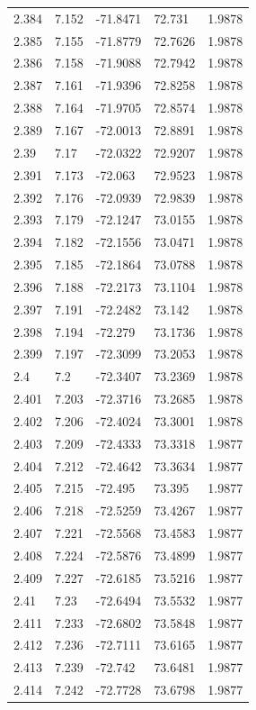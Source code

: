 \begin{tabular}{lllll}
2.384 & 7.152 & -71.8471 & 72.731 & 1.9878 \\
2.385 & 7.155 & -71.8779 & 72.7626 & 1.9878 \\
2.386 & 7.158 & -71.9088 & 72.7942 & 1.9878 \\
2.387 & 7.161 & -71.9396 & 72.8258 & 1.9878 \\
2.388 & 7.164 & -71.9705 & 72.8574 & 1.9878 \\
2.389 & 7.167 & -72.0013 & 72.8891 & 1.9878 \\
2.39 & 7.17 & -72.0322 & 72.9207 & 1.9878 \\
2.391 & 7.173 & -72.063 & 72.9523 & 1.9878 \\
2.392 & 7.176 & -72.0939 & 72.9839 & 1.9878 \\
2.393 & 7.179 & -72.1247 & 73.0155 & 1.9878 \\
2.394 & 7.182 & -72.1556 & 73.0471 & 1.9878 \\
2.395 & 7.185 & -72.1864 & 73.0788 & 1.9878 \\
2.396 & 7.188 & -72.2173 & 73.1104 & 1.9878 \\
2.397 & 7.191 & -72.2482 & 73.142 & 1.9878 \\
2.398 & 7.194 & -72.279 & 73.1736 & 1.9878 \\
2.399 & 7.197 & -72.3099 & 73.2053 & 1.9878 \\
2.4 & 7.2 & -72.3407 & 73.2369 & 1.9878 \\
2.401 & 7.203 & -72.3716 & 73.2685 & 1.9878 \\
2.402 & 7.206 & -72.4024 & 73.3001 & 1.9878 \\
2.403 & 7.209 & -72.4333 & 73.3318 & 1.9877 \\
2.404 & 7.212 & -72.4642 & 73.3634 & 1.9877 \\
2.405 & 7.215 & -72.495 & 73.395 & 1.9877 \\
2.406 & 7.218 & -72.5259 & 73.4267 & 1.9877 \\
2.407 & 7.221 & -72.5568 & 73.4583 & 1.9877 \\
2.408 & 7.224 & -72.5876 & 73.4899 & 1.9877 \\
2.409 & 7.227 & -72.6185 & 73.5216 & 1.9877 \\
2.41 & 7.23 & -72.6494 & 73.5532 & 1.9877 \\
2.411 & 7.233 & -72.6802 & 73.5848 & 1.9877 \\
2.412 & 7.236 & -72.7111 & 73.6165 & 1.9877 \\
2.413 & 7.239 & -72.742 & 73.6481 & 1.9877 \\
2.414 & 7.242 & -72.7728 & 73.6798 & 1.9877 \\

\end{tabular}
